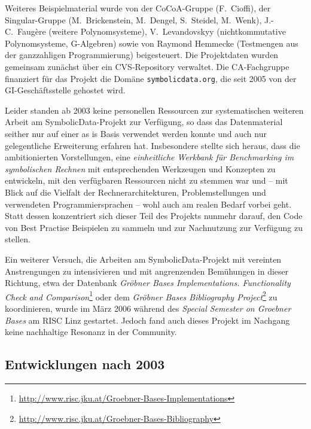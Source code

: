 \documentclass{article}
\newcommand{\SD}{{\sc Symbolic\-Data}}
\begin{document}
Weiteres Beispielmaterial wurde von der CoCoA-Gruppe (F.~Cioffi), der
Singular-Gruppe (M.~Brickenstein, M.~Dengel, S.~Steidel, M.~Wenk),
J.-C.~Faugère (weitere Polynomsysteme), V.~Levandovskyy (nichtkommutative
Polynomsysteme, G-Algebren) sowie von Raymond Hemmecke (Testmengen aus der
ganzzahligen Programmierung) beigesteuert.  Die Projektdaten wurden gemeinsam
zunächst über ein CVS-Repository verwaltet.  Die CA-Fachgruppe finanziert für
das Projekt die Domäne \texttt{symbolicdata.org}, die seit 2005 von der
GI-Geschäftsstelle gehostet wird.

Leider standen ab 2003 keine personellen Ressourcen zur systematischen
weiteren Arbeit am \SD-Projekt zur Verfügung, so dass das Datenmaterial
seither nur auf einer {\glqq}as is{\grqq} Basis verwendet werden konnte und
auch nur gelegentliche Erweiterung erfahren hat. Insbesondere stellte sich
heraus, dass die ambitionierten Vorstellungen, eine \emph{einheitliche
  Werkbank für Benchmarking im symbolischen Rechnen} mit entsprechenden
Werkzeugen und Konzepten zu entwickeln, mit den verfügbaren Ressourcen nicht
zu stemmen war und -- mit Blick auf die Vielfalt der Rechnerarchitekturen,
Problemstellungen und verwendeten Programmiersprachen -- wohl auch am realen
Bedarf vorbei geht. Statt dessen konzentriert sich dieser Teil des Projekts
nunmehr darauf, den Code von Best Practise Beispielen zu sammeln und zur
Nachnutzung zur Verfügung zu stellen.  

Ein weiterer Versuch, die Arbeiten am \SD-Projekt mit vereinten Anstrengungen
zu intensivieren und mit angrenzenden Bemühungen in dieser Richtung, etwa der
Datenbank \emph{Gröbner Bases Implementations. Functionality Check and
  Comparison}\footnote{\url{http://www.risc.jku.at/Groebner-Bases-Implementations}}
oder dem \emph{Gröbner Bases Bibliography
  Project}\footnote{\url{http://www.risc.jku.at/Groebner-Bases-Bibliography}}
zu koordinieren, wurde im März 2006 während des \emph{Special Semester on
  Groebner Bases} am RISC Linz gestartet.  Jedoch fand auch dieses Projekt im
Nachgang keine nachhaltige Resonanz in der Community. 

\subsection*{Entwicklungen nach 2003}
\end{document}
